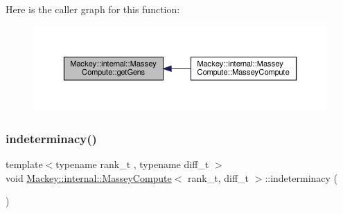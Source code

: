 Here is the caller graph for this function\+:\nopagebreak
\begin{figure}[H]
\begin{center}
\leavevmode
\includegraphics[width=350pt]{structMackey_1_1internal_1_1MasseyCompute_ae7e9d0ea52c8e8373374535d41221dcb_icgraph}
\end{center}
\end{figure}
\mbox{\label{structMackey_1_1internal_1_1MasseyCompute_a720436488adcfdf1d976b27be7d95b55}} 
\subsubsection{\texorpdfstring{indeterminacy()}{indeterminacy()}}
{\footnotesize\ttfamily template$<$typename rank\+\_\+t , typename diff\+\_\+t $>$ \\
void \hyperlink{structMackey_1_1internal_1_1MasseyCompute}{Mackey\+::internal\+::\+Massey\+Compute}$<$ rank\+\_\+t, diff\+\_\+t $>$\+::indeterminacy (\begin{DoxyParamCaption}{ }\end{DoxyParamCaption})}

